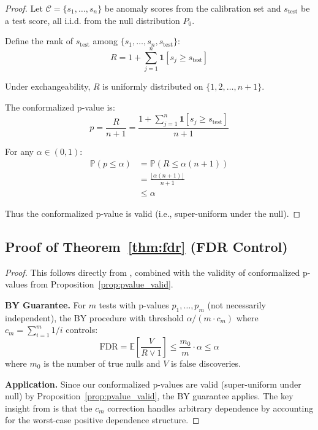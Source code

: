 \documentclass{article}
\theoremstyle{plain}
\theoremstyle{definition}
\theoremstyle{remark}
\begin{document}
\begin{proof}
Let $\mathcal{C} = \{s_1, \ldots, s_n\}$ be anomaly scores from the calibration set and $s_{\text{test}}$ be a test score, all i.i.d. from the null distribution $P_0$.

Define the rank of $s_{\text{test}}$ among $\{s_1, \ldots, s_n, s_{\text{test}}\}$:
\begin{equation}
R = 1 + \sum_{j=1}^n \mathbf{1}[s_j \geq s_{\text{test}}]
\end{equation}

Under exchangeability, $R$ is uniformly distributed on $\{1, 2, \ldots, n+1\}$.

The conformalized p-value is:
\begin{equation}
p = \frac{R}{n+1} = \frac{1 + \sum_{j=1}^n \mathbf{1}[s_j \geq s_{\text{test}}]}{n+1}
\end{equation}

For any $\alpha \in (0, 1)$:
\begin{align}
\mathbb{P}(p \leq \alpha) &= \mathbb{P}\left(R \leq \alpha(n+1)\right) \\
&= \frac{\lfloor \alpha(n+1) \rfloor}{n+1} \\
&\leq \alpha
\end{align}

Thus the conformalized p-value is valid (i.e., super-uniform under the null).
\end{proof}

\subsection{Proof of Theorem~\ref{thm:fdr} (FDR Control)}
\label{app:proof_fdr}

\begin{proof}
This follows directly from \citet{benjamini2001control}, combined with the validity of conformalized p-values from Proposition~\ref{prop:pvalue_valid}.

\textbf{BY Guarantee.} For $m$ tests with p-values $p_1, \ldots, p_m$ (not necessarily independent), the BY procedure with threshold $\alpha/(m \cdot c_m)$ where $c_m = \sum_{i=1}^m 1/i$ controls:
\begin{equation}
\text{FDR} = \mathbb{E}\left[\frac{V}{R \vee 1}\right] \leq \frac{m_0}{m} \cdot \alpha \leq \alpha
\end{equation}
where $m_0$ is the number of true nulls and $V$ is false discoveries.

\textbf{Application.} Since our conformalized p-values are valid (super-uniform under null) by Proposition~\ref{prop:pvalue_valid}, the BY guarantee applies. The key insight from \citet{benjamini2001control} is that the $c_m$ correction handles arbitrary dependence by accounting for the worst-case positive dependence structure.
\end{proof}
\end{document}
